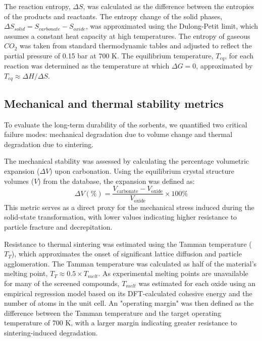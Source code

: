 \documentclass[]{article}
\begin{document}
The reaction entropy, $\Delta S$, was calculated as the difference between the entropies of the products and reactants. The entropy change of the solid phases, $\Delta S_{solid} = S_{carbonate} - S_{oxide}$, was approximated using the Dulong-Petit limit, which assumes a constant heat capacity at high temperatures. The entropy of gaseous $CO_2$ was taken from standard thermodynamic tables and adjusted to reflect the partial pressure of 0.15 bar at 700 K. The equilibrium temperature, $T_{eq}$, for each reaction was determined as the temperature at which $\Delta G = 0$, approximated by $T_{eq} \approx \Delta H / \Delta S$.

\subsection{Mechanical and thermal stability metrics}
To evaluate the long-term durability of the sorbents, we quantified two critical failure modes: mechanical degradation due to volume change and thermal degradation due to sintering.

The mechanical stability was assessed by calculating the percentage volumetric expansion ($\Delta V$) upon carbonation. Using the equilibrium crystal structure volumes ($V$) from the database, the expansion was defined as:
\begin{equation}
    \Delta V (\%) = \frac{V_{\text{carbonate}} - V_{\text{oxide}}}{V_{\text{oxide}}} \times 100\%
\end{equation}
This metric serves as a direct proxy for the mechanical stress induced during the solid-state transformation, with lower values indicating higher resistance to particle fracture and decrepitation.

Resistance to thermal sintering was estimated using the Tamman temperature ($T_T$), which approximates the onset of significant lattice diffusion and particle agglomeration. The Tamman temperature was calculated as half of the material's melting point, $T_T \approx 0.5 \times T_{melt}$. As experimental melting points are unavailable for many of the screened compounds, $T_{melt}$ was estimated for each oxide using an empirical regression model based on its DFT-calculated cohesive energy and the number of atoms in the unit cell. An "operating margin" was then defined as the difference between the Tamman temperature and the target operating temperature of 700 K, with a larger margin indicating greater resistance to sintering-induced degradation.
\end{document}
